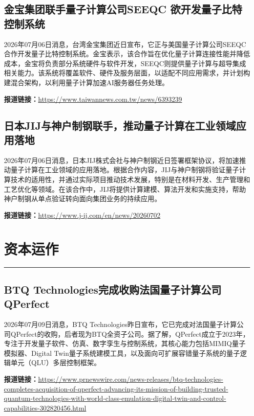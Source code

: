 \documentclass[12pt,a4paper]{ctexart}
\begin{document}
\subsection{ 金宝集团联手量子计算公司SEEQC 欲开发量子比特控制系统 }

2026年07月06日消息，台湾金宝集团近日宣布，它正与美国量子计算公司SEEQC合作开发量子比特控制系统。金宝表示，该合作旨在优化量子计算连接性能并降低成本，金宝将负责部分系统硬件与软件开发，SEEQC则提供量子计算与超导集成相关能力。该系统将覆盖软件、硬件及服务层面，以适配不同应用需求，并计划构建混合架构，以利用量子计算加速AI服务器任务处理。

\noindent\textbf{报道链接：}\url{https://www.taiwannews.com.tw/news/6393239}

\subsection{ 日本JIJ与神户制钢联手，推动量子计算在工业领域应用落地 }

2026年07月06日消息，日本JIJ株式会社与神户制钢近日签署框架协议，将加速推动量子计算在工业领域的应用落地。根据合作内容，JIJ与神户制钢将验证量子计算技术的适用性，并通过实际项目推动技术发展，特别是在材料开发、生产管理和工艺优化等领域。在该合作中，JIJ将提供计算建模、算法开发和实施支持，帮助神户制钢从单点验证转向面向集团业务的持续应用。

\noindent\textbf{报道链接：}\url{https://www.j-ij.com/en/news/20260702}


\newpage
\section{资本运作}
\vspace{-0.5em}
\noindent\rule{\linewidth}{1.5pt}

\subsection{ BTQ Technologies完成收购法国量子计算公司QPerfect }

2026年07月09日消息，BTQ Technologies昨日宣布，它已完成对法国量子计算公司QPerfect的收购，后者现为BTQ全资子公司。据了解，QPerfect成立于2023年，专注于开发量子软件、仿真、数字孪生与控制系统，其核心能力包括MIMIQ量子模拟器、Digital Twin量子系统建模工具，以及面向可扩展容错量子系统的量子逻辑单元（QLU）多层控制框架。

\noindent\textbf{报道链接：}\url{https://www.prnewswire.com/news-releases/btq-technologies-completes-acquisition-of-qperfect-advancing-its-mission-of-building-trusted-quantum-technologies-with-world-class-emulation-digital-twin-and-control-capabilities-302820456.html}
\end{document}
